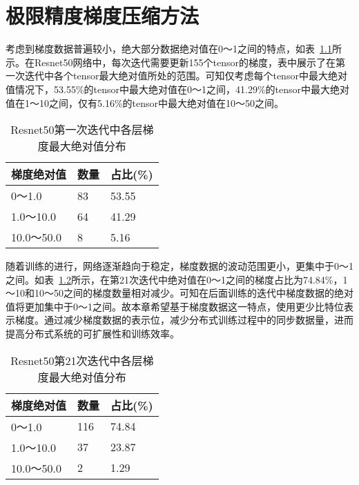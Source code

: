 \chapter{极限精度梯度压缩方法}
考虑到梯度数据普遍较小，绝大部分数据绝对值在0～1之间的特点，如表~\ref{tab:resnet50_1iter_grad_fabs}所示。在Resnet50网络中，每次迭代需要更新155个tensor的梯度，表中展示了在第一次迭代中各个tensor最大绝对值所处的范围。可知仅考虑每个tensor中最大绝对值情况下，53.55\%的tensor中最大绝对值在0～1之间，41.29\%的tensor中最大绝对值在1～10之间，仅有5.16\%的tensor中最大绝对值在10～50之间。
\begin{table}[htb]
\centering
\noindent\begin{minipage}{0.65\textwidth}
\centering
\caption{Resnet50第一次迭代中各层梯度最大绝对值分布}
\label{tab:resnet50_1iter_grad_fabs}
\begin{tabular}{p{2.5cm}p{2.5cm}p{2.5cm}}
\toprule[1.5pt]
梯度绝对值 & 数量 & 占比(\%) \\\midrule[1pt]
0～1.0 & 83 & 53.55\\
1.0～10.0 & 64 & 41.29\\
10.0～50.0 & 8 & 5.16\\
\midrule[1pt]
\end{tabular}
\end{minipage}
\end{table}

随着训练的进行，网络逐渐趋向于稳定，梯度数据的波动范围更小，更集中于0～1之间。如表~\ref{tab:resnet50_21iter_grad_fabs}所示，在第21次迭代中绝对值在0～1之间的梯度占比为74.84\%，1～10和10～50之间的梯度数量相对减少。可知在后面训练的迭代中梯度数据的绝对值将更加集中于0～1之间。故本章希望基于梯度数据这一特点，使用更少比特位表示梯度。通过减少梯度数据的表示位，减少分布式训练过程中的同步数据量，进而提高分布式系统的可扩展性和训练效率。
\begin{table}[htb]
\centering
\noindent\begin{minipage}{0.65\textwidth}
\centering
\caption{Resnet50第21次迭代中各层梯度最大绝对值分布}
\label{tab:resnet50_21iter_grad_fabs}
\begin{tabular}{p{2.5cm}p{2.5cm}p{2.5cm}}
\toprule[1.5pt]
梯度绝对值 & 数量 & 占比(\%) \\\midrule[1pt]
0～1.0 & 116 & 74.84\\
1.0～10.0 & 37 & 23.87\\
10.0～50.0 & 2 & 1.29\\
\midrule[1pt]
\end{tabular}
\end{minipage}
\end{table}

